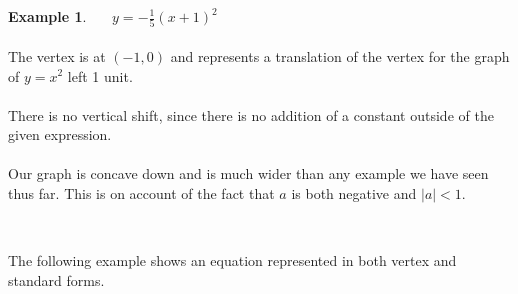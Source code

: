 \documentclass[12pt]{book}
\theoremstyle{definition}
\newtheorem{example}{Example}
\begin{document}
\begin{multicols}{2}
\begin{example}~~~$y=-\frac{1}{5}(x+1)^2$\\
~\\
The vertex is at $(-1,0)$ and represents a translation of the vertex for the graph of $y=x^2$ left 1 unit. \\ \\
There is no vertical shift, since there is no addition of a constant outside of the given expression.\\  \\ 
Our graph is concave down and is much wider than any example we have seen thus far.  This is on account of the fact that $a$ is both negative and $|a|<1$.

\columnbreak
~\par
\begin{center}
\end{center}
\end{example}
\end{multicols}

The following example shows an equation represented in both vertex and standard forms.
	
\end{document}
